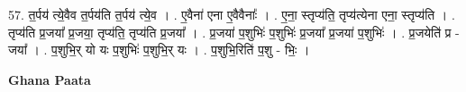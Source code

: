 \documentclass[17pt]{extarticle}
\begin{document}
57. त॒र्पय॑ त्ये॒वैव त॒र्पय॑ति त॒र्पय॑ त्ये॒व । . ए॒वैना॑ एना ए॒वैवैनाः᳚ । . ए॒ना॒ स्तृप्य॑ति॒ तृप्य॑त्येना एना॒ स्तृप्य॑ति । . तृप्य॑ति प्र॒जया᳚ प्र॒जया॒ तृप्य॑ति॒ तृप्य॑ति प्र॒जया᳚ । . प्र॒जया॑ प॒शुभिः॑ प॒शुभिः॑ प्र॒जया᳚ प्र॒जया॑ प॒शुभिः॑ । . प्र॒जयेति॑ प्र - जया᳚ । . प॒शुभि॒र् यो यः प॒शुभिः॑ प॒शुभि॒र् यः । . प॒शुभि॒रिति॑ प॒शु - भिः॒ । \newline

\textbf{Ghana Paata } \newline
\end{document}
